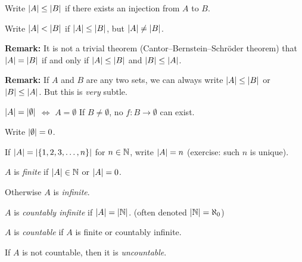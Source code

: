 \documentclass[10pt,aspectratio=149]{beamer}
\begin{document}
\begin{frame}

\begin{definition}
Write
$\left\lvert {A} \right\rvert \leq \left\lvert {B} \right\rvert$
if there exists an injection from $A$ to $B$.

\pause
Write $\left\lvert {A} \right\rvert < \left\lvert {B} \right\rvert$
if $\left\lvert {A} \right\rvert \leq \left\lvert {B} \right\rvert$, but
$\left\lvert {A} \right\rvert \not= \left\lvert {B} \right\rvert$.
\end{definition}

\pause
\textbf{Remark:}
It is not a trivial theorem (Cantor--Bernstein--Schr\"oder theorem) that
$\left\lvert {A} \right\rvert = \left\lvert {B} \right\rvert$ if and only if
$\left\lvert {A} \right\rvert \leq \left\lvert {B} \right\rvert$ and
$\left\lvert {B} \right\rvert \leq \left\lvert {A} \right\rvert$.

\medskip
\pause

\textbf{Remark:}
If $A$ and $B$ are any two sets,
we can always write $\left\lvert {A} \right\rvert \leq \left\lvert {B} \right\rvert$ or
$\left\lvert {B} \right\rvert \leq \left\lvert {A} \right\rvert$.  But this is \emph{very} subtle.

\pause
\medskip

$\left\lvert {A} \right\rvert = \left\lvert {\emptyset} \right\rvert$ $\Leftrightarrow$ $A = \emptyset$
\quad
If $B \not= \emptyset$,
no $f \colon B \to \emptyset$ can exist.

\pause
Write $\left\lvert {\emptyset} \right\rvert = 0$.

\medskip
\pause

If $\left\lvert {A} \right\rvert = \left\lvert {\{ 1,2,3,\ldots,n \}} \right\rvert$ for $n \in {\mathbb{N}}$, write
$\left\lvert {A} \right\rvert = n$ (exercise: such $n$ is unique).

\pause

\begin{definition}
$A$ is \emph{finite} if $\left\lvert {A} \right\rvert \in {\mathbb{N}}$ or $\left\lvert {A} \right\rvert=0$.

\pause
Otherwise $A$ is \emph{infinite}.

\pause
$A$ is \emph{countably infinite} if $\left\lvert {A} \right\rvert = \left\lvert {{\mathbb{N}}} \right\rvert$.
\qquad (often denoted $\left\lvert {{\mathbb{N}}} \right\rvert = \aleph_0$)

\pause
$A$ is \emph{countable} if $A$ is finite or countably infinite.

\pause
If $A$ is not countable, then it is \emph{uncountable}.
\end{definition}
\end{frame}
\end{document}
